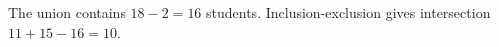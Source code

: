 The union contains $18-2=16$ students. Inclusion-exclusion gives intersection $11+15-16=\boxed{10}$.
